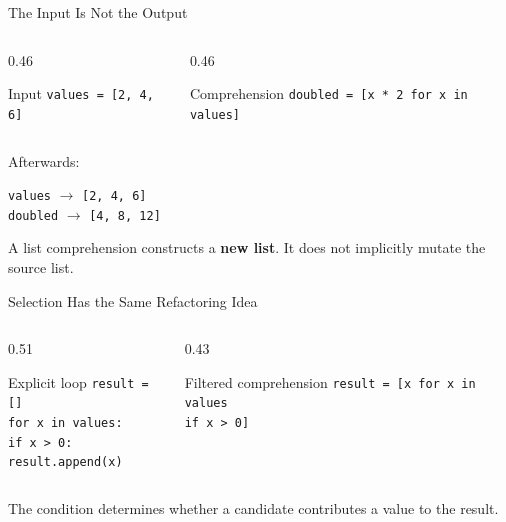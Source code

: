 \documentclass[aspectratio=169,10pt]{beamer}
\begin{document}
\begin{frame}{The Input Is Not the Output}
  \begin{columns}[T,onlytextwidth]
    \begin{column}{0.46\textwidth}
      \begin{block}{Input}
        \texttt{values = [2, 4, 6]}
      \end{block}
    \end{column}
    \begin{column}{0.46\textwidth}
      \begin{block}{Comprehension}
        \texttt{doubled = [x * 2 for x in values]}
      \end{block}
    \end{column}
  \end{columns}

  Afterwards:
  \begin{center}
    \texttt{values} $\rightarrow$ \texttt{[2, 4, 6]}\\
    \texttt{doubled} $\rightarrow$ \texttt{[4, 8, 12]}
  \end{center}

  \begin{keyidea}
    A list comprehension constructs a \textbf{new list}. It does not implicitly mutate the source list.
  \end{keyidea}
\end{frame}


\begin{frame}{Selection Has the Same Refactoring Idea}
  \begin{columns}[T,onlytextwidth]
    \begin{column}{0.51\textwidth}
      \begin{block}{Explicit loop}
        \texttt{result = []}\\
        \texttt{for x in values:}\\
        \hspace{0.18in}\texttt{if x > 0:}\\
        \hspace{0.36in}\texttt{result.append(x)}
      \end{block}
    \end{column}
    \begin{column}{0.43\textwidth}
      \begin{block}{Filtered comprehension}
        \texttt{result = [x for x in values}\\
        \hspace{0.48in}\texttt{if x > 0]}
      \end{block}
    \end{column}
  \end{columns}

  The condition determines whether a candidate contributes a value to the result.
\end{frame}
\end{document}
